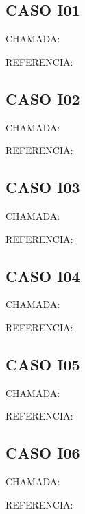 \documentclass{undftex}
\begin{document}
\begin{refsection}\section*{CASO I01}\noindent CHAMADA:  \par\noindent REFERENCIA:\par\printbibliography[heading=none]\end{refsection}\clearpage
\begin{refsection}\section*{CASO I02}\noindent CHAMADA:  \par\noindent REFERENCIA:\par\printbibliography[heading=none]\end{refsection}\clearpage
\begin{refsection}\section*{CASO I03}\noindent CHAMADA:  \par\noindent REFERENCIA:\par\printbibliography[heading=none]\end{refsection}\clearpage
\begin{refsection}\section*{CASO I04}\noindent CHAMADA:  \par\noindent REFERENCIA:\par\printbibliography[heading=none]\end{refsection}\clearpage
\begin{refsection}\section*{CASO I05}\noindent CHAMADA:  \par\noindent REFERENCIA:\par\printbibliography[heading=none]\end{refsection}\clearpage
\begin{refsection}\section*{CASO I06}\noindent CHAMADA:  \par\noindent REFERENCIA:\par\printbibliography[heading=none]\end{refsection}\clearpage
\end{document}
